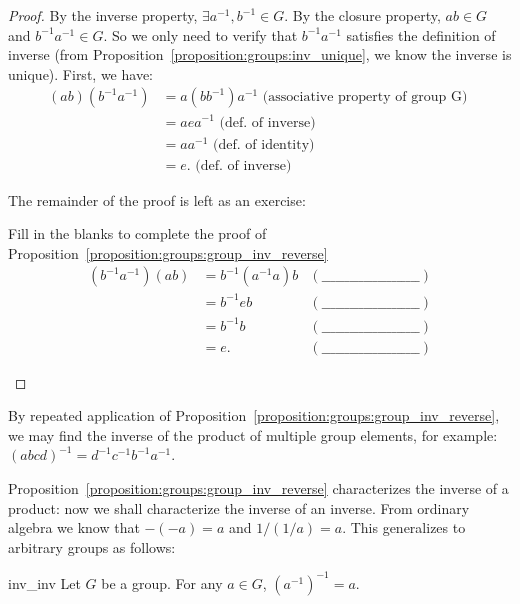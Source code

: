 \begin{proof}
By the inverse property, $ \exists a^{-1}, b^{-1} \in G$. By the closure property, $ab \in G$ and $b^{-1}a^{-1} \in G$. So
we only need to verify that $b^{-1}a^{-1}$ satisfies the definition of inverse (from Proposition~\ref{proposition:groups:inv_unique}, we know the inverse is unique). First, we have:    
\begin{align*}
(ab)(b^{-1}a^{-1}) & = a(bb^{-1})a^{-1}  \text{ (associative property of group G) } \\
 & = aea^{-1}  \text{ (def. of inverse) } \\
 & = aa^{-1}  \text{ (def. of identity) } \\
 & = e.  \text{ (def. of inverse) }
\end{align*}

\noindent
The remainder of the proof is left as an exercise:

\begin{exercise}{42}
Fill in the blanks to complete the proof of Proposition~\ref{proposition:groups:group_inv_reverse}
\begin{align*}
(b^{-1}a^{-1})(ab) & = b^{-1}(a^{-1}a)b  &(\_\_\_\_\_\_\_\_\_\_\_\_\_\_\_\_\_\_\_\_\_) \\
 & = b^{-1}eb  &(\_\_\_\_\_\_\_\_\_\_\_\_\_\_\_\_\_\_\_\_\_) \\
 & = b^{-1}b  &(\_\_\_\_\_\_\_\_\_\_\_\_\_\_\_\_\_\_\_\_\_) \\
 & = e.  &(\_\_\_\_\_\_\_\_\_\_\_\_\_\_\_\_\_\_\_\_\_)
\end{align*}
\end{exercise}
\end{proof}

By repeated application of Proposition~\ref{proposition:groups:group_inv_reverse}, we may find the inverse of the product of multiple group elements, for example: $(abcd)^{-1} = d^{-1}c^{-1}b^{-1}a^{-1}$.
 
Proposition~\ref{proposition:groups:group_inv_reverse} characterizes the inverse of a product: now we shall characterize the inverse of an inverse. From ordinary algebra we know that $-(-a) = a$ and $1/(1/a) = a$. This generalizes to arbitrary groups as follows:

\begin{prop}{inv_inv}
Let $G$ be a group.  For any $a \in G$, $(a^{-1})^{-1} = a$.
\end{prop}
 
